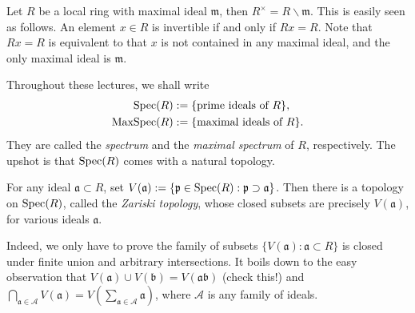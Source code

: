 \begin{remark}
	Let $R$ be a local ring with maximal ideal $\mathfrak{m}$, then $R^\times = R \smallsetminus \mathfrak{m}$. This is easily seen as follows. An element $x \in R$ is invertible if and only if $Rx = R$. Note that $Rx=R$ is equivalent to that $x$ is not contained in any maximal ideal, and the only maximal ideal is $\mathfrak{m}$.
\end{remark}

Throughout these lectures, we shall write  
\begin{align*}
	\operatorname{Spec}(R) & := \{ \text{prime ideals of } R \}, \\
	\operatorname{MaxSpec}(R) & := \{ \text{maximal ideals of } R \}.
\end{align*}
They are called the \emph{spectrum} and the \emph{maximal spectrum} of $R$, respectively. The upshot is that $\operatorname{Spec}(R)$ comes with a natural topology.

\begin{definition} 
	For any ideal $\mathfrak{a} \subset R$, set $V(\mathfrak{a}) := \{ \mathfrak{p} \in \operatorname{Spec}(R): \mathfrak{p} \supset \mathfrak{a} \}$. Then there is a topology on $\operatorname{Spec}(R)$, called the \emph{Zariski topology}, whose closed subsets are precisely $V(\mathfrak{a})$, for various ideals $\mathfrak{a}$.
\end{definition}
Indeed, we only have to prove the family of subsets $\{ V(\mathfrak{a}) : \mathfrak{a} \subset R \}$ is closed under finite union and arbitrary intersections. It boils down to the easy observation that $V(\mathfrak{a}) \cup V(\mathfrak{b}) = V(\mathfrak{a}\mathfrak{b})$ (check this!) and $\bigcap_{\mathfrak{a} \in \mathcal{A}} V(\mathfrak{a}) = V\left( \sum_{\mathfrak{a} \in \mathcal{A}} \mathfrak{a} \right)$, where $\mathcal{A}$ is any family of ideals.

